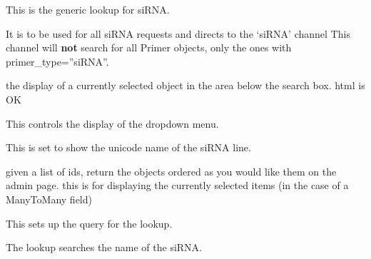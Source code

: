 \documentclass[letterpaper,10pt,english]{sphinxmanual}
\begin{document}

\begin{fulllineitems}
\label{api:experimentdb.reagents.lookups.SiRNALookup}
This is the generic lookup for siRNA.

It is to be used for all siRNA requests and directs to the `siRNA' channel
This channel will \textbf{not} search for all Primer objects, only the ones with primer\_type=''siRNA''.

\begin{fulllineitems}
\label{api:experimentdb.reagents.lookups.SiRNALookup.format_item}
the display of a currently selected object in the area below the search box. html is OK

\end{fulllineitems}


\begin{fulllineitems}
\label{api:experimentdb.reagents.lookups.SiRNALookup.format_result}
This controls the display of the dropdown menu.

This is set to show the unicode name of the siRNA line.

\end{fulllineitems}


\begin{fulllineitems}
\label{api:experimentdb.reagents.lookups.SiRNALookup.get_objects}
given a list of ids, return the objects ordered as you would like them on the admin page.
this is for displaying the currently selected items (in the case of a ManyToMany field)

\end{fulllineitems}


\begin{fulllineitems}
\label{api:experimentdb.reagents.lookups.SiRNALookup.get_query}
This sets up the query for the lookup.

The lookup searches the name of the siRNA.

\end{fulllineitems}


\end{fulllineitems}
\end{document}
